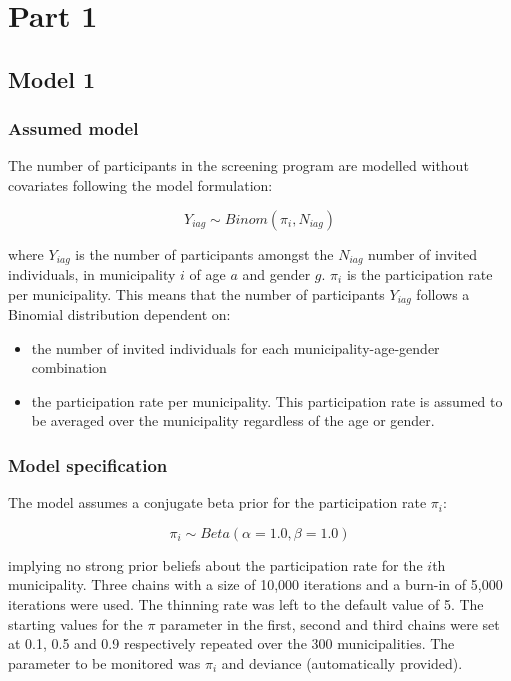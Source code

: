 \documentclass[12pt]{article}
\begin{document}
\section{Part 1}

\subsection{Model 1}

\subsubsection{Assumed model}
The number of participants in the screening program are modelled without covariates following the model formulation:

\[
    Y_{iag} \sim Binom(\pi_{i}, N_{iag})
\]

where $Y_{iag}$ is the number of participants amongst the $N_{iag}$ number of invited individuals, in municipality $i$ of age $a$ and gender $g$. $\pi_{i}$ is the participation rate per municipality. This means that the number of participants $Y_{iag}$ follows a Binomial distribution dependent on:

\begin{itemize}
    \item the number of invited individuals for each municipality-age-gender combination
    \item the participation rate per municipality. This participation rate is assumed to be averaged over the municipality regardless of the age or gender. 
\end{itemize}

\subsubsection{Model specification}



The model assumes a conjugate beta prior for the participation rate $\pi_i$:

\[
    \pi_{i} \sim Beta(\alpha=1.0, \beta=1.0)
\]

\noindent implying no strong prior beliefs about the participation rate for the $i$th municipality. Three chains with a size of 10,000 iterations and a burn-in of 5,000 iterations were used. The thinning rate was left to the default value of 5. The starting values for the $\pi$ parameter in the first, second and third chains were set at 0.1, 0.5 and 0.9 respectively repeated over the 300 municipalities. The parameter to be monitored was $\pi_i$ and deviance (automatically provided). 
\end{document}
